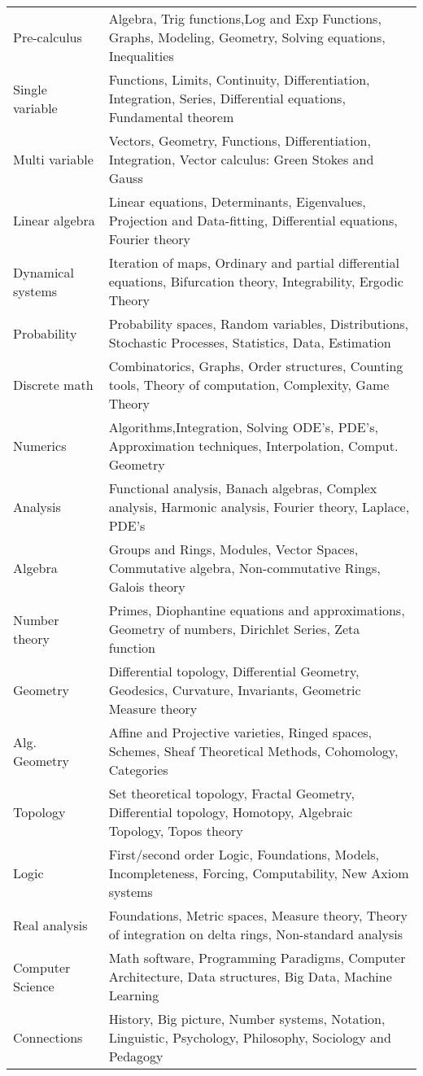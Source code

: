 \documentclass[12pt]{amsart}
\begin{document}
\begin{tiny}
\begin{tabular}{|l|l|} \hline
Pre-calculus& Algebra, Trig functions,Log and Exp Functions, Graphs, Modeling, Geometry, Solving equations, Inequalities \\
Single variable& Functions, Limits, Continuity, Differentiation, Integration, Series, Differential equations,
Fundamental theorem \\
Multi variable& Vectors, Geometry, Functions, Differentiation, Integration, Vector calculus: Green Stokes and Gauss \\
Linear algebra& Linear equations, Determinants, Eigenvalues, Projection and Data-fitting, Differential equations, Fourier theory \\
Dynamical systems& Iteration of maps, Ordinary and partial differential equations, Bifurcation theory, Integrability, Ergodic Theory \\
Probability& Probability spaces, Random variables, Distributions, Stochastic Processes, Statistics, Data, Estimation \\
Discrete math& Combinatorics, Graphs, Order structures, Counting tools, Theory of computation, Complexity, Game Theory \\
Numerics& Algorithms,Integration, Solving ODE's, PDE's, Approximation techniques, Interpolation, Comput. Geometry \\
Analysis& Functional analysis, Banach algebras, Complex analysis, Harmonic analysis, Fourier theory, Laplace, PDE's \\
Algebra& Groups and Rings, Modules, Vector Spaces, Commutative algebra, Non-commutative Rings, Galois theory \\
Number theory& Primes, Diophantine equations and approximations, Geometry of numbers, Dirichlet Series, Zeta function \\
Geometry& Differential topology, Differential Geometry, Geodesics, Curvature, Invariants, Geometric Measure theory \\
Alg. Geometry& Affine and Projective varieties, Ringed spaces, Schemes, Sheaf Theoretical Methods, Cohomology, Categories \\
Topology&  Set theoretical topology, Fractal Geometry, Differential topology, Homotopy, Algebraic Topology, Topos theory \\
Logic& First/second order Logic, Foundations, Models, Incompleteness, Forcing, Computability, New Axiom systems \\
Real analysis& Foundations, Metric spaces, Measure theory, Theory of integration on delta rings, Non-standard analysis \\
Computer Science& Math software, Programming Paradigms, Computer Architecture, Data structures, Big Data, Machine Learning \\
Connections& History, Big picture, Number systems, Notation, Linguistic, Psychology, Philosophy, Sociology and Pedagogy \\ \hline
\end{tabular}
\end{tiny}
\end{document}
